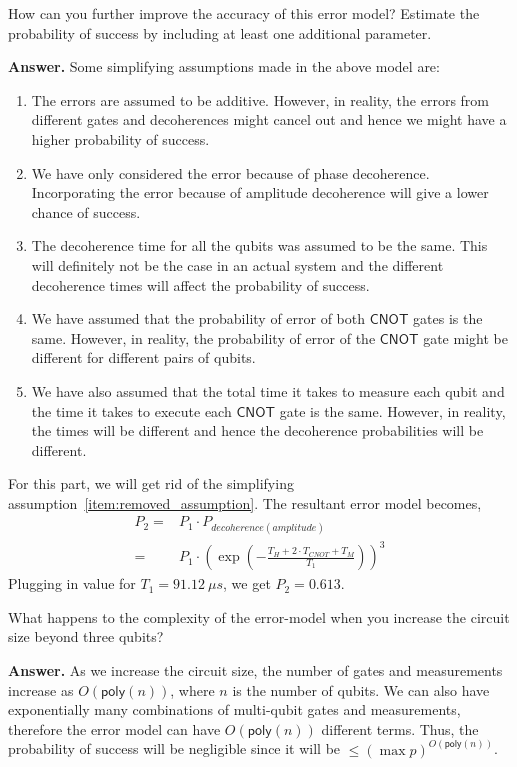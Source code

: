 \tcbline{}

\begin{question}
    How can you further improve the accuracy of this error model? Estimate the probability of success by including at least one additional parameter.
\end{question}
\textbf{Answer.} Some simplifying assumptions made in the above model are:
\begin{enumerate}
    \item The errors are assumed to be additive. However, in reality, the errors from different gates and decoherences might cancel out and hence we might have a higher probability of success.
    \item \label{item:removed_assumption} We have only considered the error because of phase decoherence. Incorporating the error because of amplitude decoherence will give a lower chance of success.
    \item The decoherence time for all the qubits was assumed to be the same. This will definitely not be the case in an actual system and the different decoherence times will affect the probability of success.
    \item We have assumed that the probability of error of both $\mathsf{CNOT}$ gates is the same. However, in reality, the probability of error of the $\mathsf{CNOT}$ gate might be different for different pairs of qubits.
    \item We have also assumed that the total time it takes to measure each qubit and the time it takes to execute each $\mathsf{CNOT}$ gate is the same. However, in reality, the times will be different and hence the decoherence probabilities will be different.
\end{enumerate}

For this part, we will get rid of the simplifying assumption~\ref{item:removed_assumption}. The resultant error model becomes,
\begin{equation}
    \begin{split}
        P_2 = &P_1\cdot P_{decoherence(amplitude)}\\
        = &P_1\cdot \left(\exp\left(-\frac{T_H + 2\cdot T_{CNOT} + T_M}{T_1}\right)\right)^3
    \end{split}
\end{equation}
Plugging in value for $T_1 = \qty{91.12}{\mu s}$, we get $P_2 = 0.613$.

\tcbline{}

\begin{question}
    What happens to the complexity of the error-model when you increase the circuit size beyond three qubits?
\end{question}
\textbf{Answer.} As we increase the circuit size, the number of gates and measurements increase as $O(\mathsf{poly}(n))$, where $n$ is the number of qubits. We can also have exponentially many combinations of multi-qubit gates and measurements, therefore the error model can have $O(\mathsf{poly}(n))$ different terms. Thus, the probability of success will be negligible since it will be $\leq \left(\max{p}\right)^{O(\mathsf{poly}(n))}$.